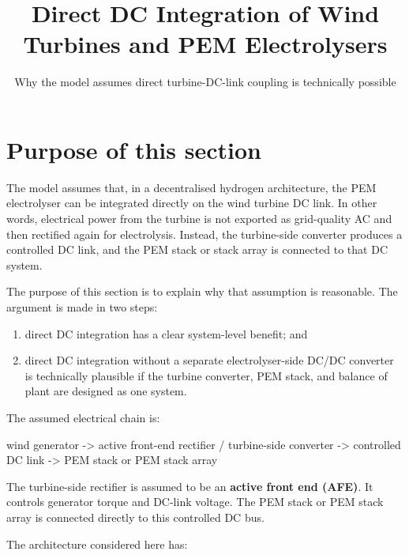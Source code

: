 \documentclass[
  letterpaper,
  DIV=11,
  numbers=noendperiod]{scrartcl}
\title{Direct DC Integration of Wind Turbines and PEM Electrolysers}
\subtitle{Why the model assumes direct turbine-DC-link coupling is
technically possible}
\author{}
\date{}
\newenvironment{Shaded}{\begin{snugshade}}{\end{snugshade}}
\newcommand{\NormalTok}[1]{\textcolor[rgb]{0.00,0.23,0.31}{#1}}
\providecommand{\tightlist}{%
  \setlength{\itemsep}{0pt}\setlength{\parskip}{0pt}}
\renewcommand*\contentsname{Table of contents}
\newcommand\contentsname{Table of contents}
\begin{document}
\maketitle

\renewcommand*\contentsname{Table of contents}
{
\setcounter{tocdepth}{3}
\tableofcontents
}

\section{Purpose of this section}\label{purpose-of-this-section}

The model assumes that, in a decentralised hydrogen architecture, the
PEM electrolyser can be integrated directly on the wind turbine DC link.
In other words, electrical power from the turbine is not exported as
grid-quality AC and then rectified again for electrolysis. Instead, the
turbine-side converter produces a controlled DC link, and the PEM stack
or stack array is connected to that DC system.

The purpose of this section is to explain why that assumption is
reasonable. The argument is made in two steps:

\begin{enumerate}
\def\labelenumi{\arabic{enumi}.}
\tightlist
\item
  direct DC integration has a clear system-level benefit; and
\item
  direct DC integration without a separate electrolyser-side DC/DC
  converter is technically plausible if the turbine converter, PEM
  stack, and balance of plant are designed as one system.
\end{enumerate}

The assumed electrical chain is:

\begin{Shaded}
\begin{Highlighting}[]
\NormalTok{wind generator {-}\textgreater{} active front{-}end rectifier / turbine{-}side converter {-}\textgreater{} controlled DC link {-}\textgreater{} PEM stack or PEM stack array}
\end{Highlighting}
\end{Shaded}

The turbine-side rectifier is assumed to be an \textbf{active front end
(AFE)}. It controls generator torque and DC-link voltage. The PEM stack
or PEM stack array is connected directly to this controlled DC bus.

The architecture considered here has:
\end{document}
